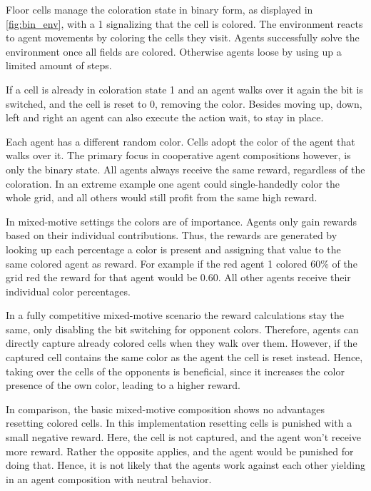 Floor cells manage the coloration state in binary form, as displayed in \ref{fig:bin_env}, with a 1 signalizing that the cell is colored. The environment reacts to agent movements by coloring the cells they visit. Agents successfully solve the environment once all fields are colored. Otherwise agents loose by using up a limited amount of steps.

If a cell is already in coloration state 1 and an agent walks over it again the bit is switched, and the cell is reset to 0, removing the color. Besides moving up, down, left and right an agent can also execute the action wait, to stay in place.

Each agent has a different random color. Cells adopt the color of the agent that walks over it. The primary focus in cooperative agent compositions however, is only the binary state. All agents always receive the same reward, regardless of the coloration. In an extreme example one agent could single-handedly color the whole grid, and all others would still profit from the same high reward.

In mixed-motive settings the colors are of importance. Agents only gain rewards based on their individual contributions. Thus, the rewards are generated by looking up each percentage a color is present and assigning that value to the same colored agent as reward. For example if the red agent 1 colored 60\% of the grid red the reward for that agent would be 0.60. All other agents receive their individual color percentages.

In a fully competitive mixed-motive scenario the reward calculations stay the same, only disabling the bit switching for opponent colors. Therefore, agents can directly capture already colored cells when they walk over them. However, if the captured cell contains the same color as the agent the cell is reset instead. Hence, taking over the cells of the opponents is beneficial, since it increases the color presence of the own color, leading to a higher reward.

In comparison, the basic mixed-motive composition shows no advantages resetting colored cells. In this implementation resetting cells is punished with a small negative reward. Here, the cell is not captured, and the agent won't receive more reward. Rather the opposite applies, and the agent would be punished for doing that. Hence, it is not likely that the agents work against each other yielding in an agent composition with neutral behavior.

